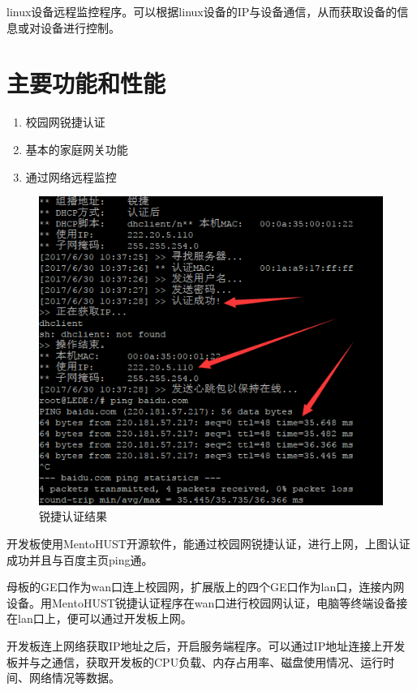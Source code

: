 \documentclass{itecreport-zh}
\begin{document}
linux设备远程监控程序。可以根据linux设备的IP与设备通信，从而获取设备的信息或对设备进行控制。

\section{主要功能和性能}

\begin{enumerate}
    \item 校园网锐捷认证
    \item 基本的家庭网关功能
    \item 通过网络远程监控
\end{enumerate}

\begin{figure}[!h]
\centering
\includegraphics[width=.6\textwidth]{ruijie.png}
\caption{锐捷认证结果}
\end{figure}

开发板使用MentoHUST开源软件，能通过校园网锐捷认证，进行上网，上图认证成功并且与百度主页ping通。


母板的GE口作为wan口连上校园网，扩展版上的四个GE口作为lan口，连接内网设备。用MentoHUST锐捷认证程序在wan口进行校园网认证，电脑等终端设备接在lan口上，便可以通过开发板上网。


开发板连上网络获取IP地址之后，开启服务端程序。可以通过IP地址连接上开发板并与之通信，获取开发板的CPU负载、内存占用率、磁盘使用情况、运行时间、网络情况等数据。
\end{document}
